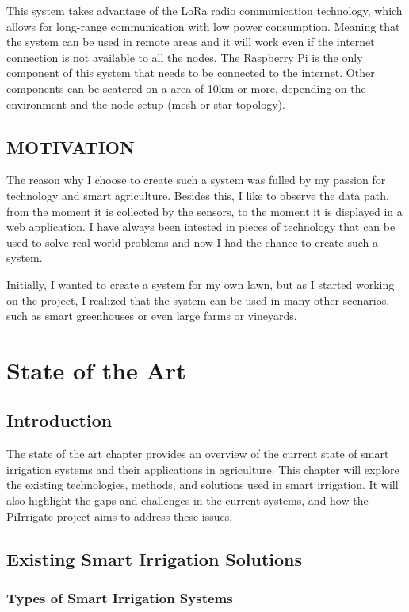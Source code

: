 This system takes advantage of the LoRa radio communication technology, 
which allows for long-range communication with low power consumption. Meaning that the system can be used in remote areas and
it will work even if the internet connection is not available to all the nodes. The Raspberry Pi is the only component of this system
that needs to be connected to the internet. Other components can be scatered on a area of 10km or more, depending on
the environment and the node setup (mesh or star topology).

\newpage
\section{MOTIVATION}


The reason why I choose to create such a system was fulled by my passion for technology and smart agriculture. Besides this,
I like to observe the data path, from the moment it is collected by the sensors, to the moment it is displayed
in a web application. 
I have always been intested in pieces of technology that can be used to solve real world problems and now I had the chance
to create such a system.

Initially, I wanted to create a system for my own lawn, but as I started working on the project, I realized that the system
can be used in many other scenarios, such as smart greenhouses or even large farms or vineyards. 

\chapter{State of the Art}\label{section:stateoftheart}

\section{Introduction}
The state of the art chapter provides an overview of the current state of smart irrigation 
systems and their applications in agriculture. 
This chapter will explore the existing technologies, methods, and solutions used in smart irrigation. 
It will also highlight the gaps and challenges in the current systems,
and how the PiIrrigate project aims to address these issues.

\section{Existing Smart Irrigation Solutions}
\subsection{Types of Smart Irrigation Systems}

